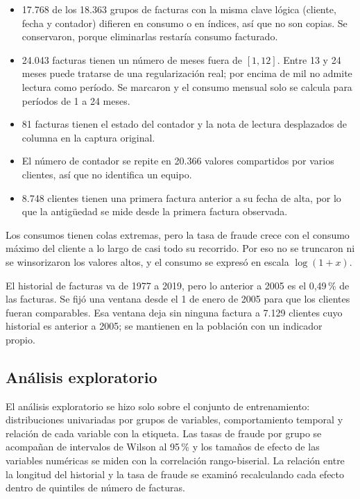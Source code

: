 \begin{itemize}
  \item 17.768 de los 18.363 grupos de facturas con la misma clave lógica (cliente, fecha y
    contador) difieren en consumo o en índices, así que no son copias. Se conservaron, porque
    eliminarlas restaría consumo facturado.
  \item 24.043 facturas tienen un número de meses fuera de $[1, 12]$. Entre 13 y 24 meses
    puede tratarse de una regularización real; por encima de mil no admite lectura como
    período. Se marcaron y el consumo mensual solo se calcula para períodos de 1 a 24 meses.
  \item 81 facturas tienen el estado del contador y la nota de lectura desplazados de
    columna en la captura original.
  \item El número de contador se repite en 20.366 valores compartidos por varios clientes,
    así que no identifica un equipo.
  \item 8.748 clientes tienen una primera factura anterior a su fecha de alta, por lo que la
    antigüedad se mide desde la primera factura observada.
\end{itemize}

Los consumos tienen colas extremas, pero la tasa de fraude crece con el consumo máximo del
cliente a lo largo de casi todo su recorrido. Por eso no se truncaron ni se winsorizaron los
valores altos, y el consumo se expresó en escala $\log(1 + x)$.

El historial de facturas va de 1977 a 2019, pero lo anterior a 2005 es el 0,49\,\% de las
facturas. Se fijó una ventana desde el 1 de enero de 2005 para que los clientes fueran
comparables. Esa ventana deja sin ninguna factura a 7.129 clientes cuyo historial es
anterior a 2005; se mantienen en la población con un indicador propio.

\subsection{Análisis exploratorio}

El análisis exploratorio se hizo solo sobre el conjunto de entrenamiento: distribuciones
univariadas por grupos de variables, comportamiento temporal y relación de cada variable con
la etiqueta. Las tasas de fraude por grupo se acompañan de intervalos de Wilson al 95\,\% y
los tamaños de efecto de las variables numéricas se miden con la correlación rango-biserial.
La relación entre la longitud del historial y la tasa de fraude se examinó recalculando cada
efecto dentro de quintiles de número de facturas.

